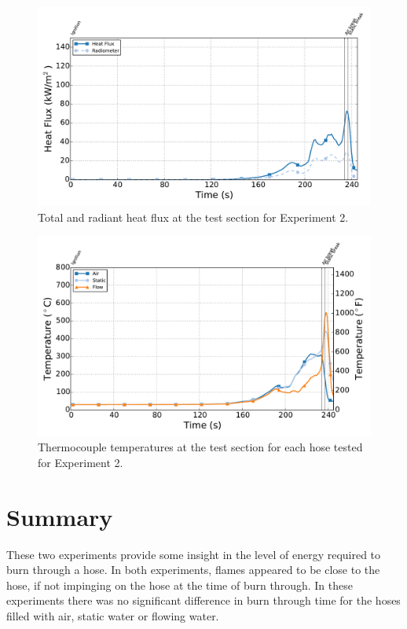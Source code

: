 \documentclass[letterpaper,11pt]{texMemo} %
\begin{document}
\begin{figure}[!ht]
\centering
\includegraphics[width=\columnwidth]{../Figures/Hose_Figures/Test_62_West_81015_Heat_Flux_2}
\caption{Total and radiant heat flux at the test section for Experiment 2.}
\label{fig:hf_A3_test62}
\end{figure}

\begin{figure}[!ht]
\centering
\includegraphics[width=\columnwidth]{../Figures/Hose_Figures/Test_62_West_81015_TC_Gear_2}
\caption{Thermocouple temperatures at the test section for each hose tested for Experiment 2.}
\label{fig:hose_A3_test62}
\end{figure}

\section{Summary}
These two experiments provide some insight in the level of energy required to burn through a hose. In both experiments, flames appeared to be close to the hose, if not impinging on the hose at the time of burn through. In these experiments there was no significant difference in burn through time for the hoses filled with air, static water or flowing water.   


\end{document}
